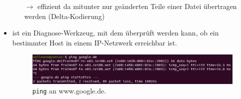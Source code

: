 \begin{itemize}
\begin{itemize}
		$\to$ effizient da mitunter nur geänderten Teile einer Datei übertragen werden (Delta-Kodierung)
	\end{itemize}
	\item {} ist ein Diagnose-Werkzeug, mit dem überprüft werden kann, ob ein bestimmter Host in einem IP-Netzwerk erreichbar ist.
	\begin{figure}[h]
		\centering
		\includegraphics[width=0.7\linewidth]{./media/ping_google}
		\caption[\texttt{ping} an Google]{\texttt{ping} an www.google.de.}
		\label{fig:pinggoogle}
	\end{figure}
\end{itemize}

